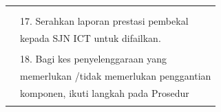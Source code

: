 \documentclass[
]{article}
\begin{document}
\begin{longtable}[]{@{}ll@{}}
\begin{minipage}[t]{0.71\columnwidth}
\end{minipage}\tabularnewline
\begin{minipage}[t]{0.23\columnwidth}\raggedright
\strut
\end{minipage} & \begin{minipage}[t]{0.71\columnwidth}\raggedright
\strut
\end{minipage}\tabularnewline
\begin{minipage}[t]{0.23\columnwidth}\raggedright
\strut
\end{minipage} & \begin{minipage}[t]{0.71\columnwidth}\raggedright
17. Serahkan laporan prestasi pembekal\strut
\end{minipage}\tabularnewline
\begin{minipage}[t]{0.23\columnwidth}\raggedright
\strut
\end{minipage} & \begin{minipage}[t]{0.71\columnwidth}\raggedright
kepada SJN ICT untuk difailkan.\strut
\end{minipage}\tabularnewline
\begin{minipage}[t]{0.23\columnwidth}\raggedright
\strut
\end{minipage} & \begin{minipage}[t]{0.71\columnwidth}\raggedright
\strut
\end{minipage}\tabularnewline
\begin{minipage}[t]{0.23\columnwidth}\raggedright
\strut
\end{minipage} & \begin{minipage}[t]{0.71\columnwidth}\raggedright
18. Bagi kes penyelenggaraan yang\strut
\end{minipage}\tabularnewline
\begin{minipage}[t]{0.23\columnwidth}\raggedright
\strut
\end{minipage} & \begin{minipage}[t]{0.71\columnwidth}\raggedright
memerlukan /tidak memerlukan penggantian\strut
\end{minipage}\tabularnewline
\begin{minipage}[t]{0.23\columnwidth}\raggedright
\strut
\end{minipage} & \begin{minipage}[t]{0.71\columnwidth}\raggedright
komponen, ikuti langkah pada Prosedur\strut
\end{minipage}\tabularnewline
\begin{minipage}[t]{0.23\columnwidth}\raggedright
\strut
\end{minipage} & \begin{minipage}[t]{0.71\columnwidth}\raggedright

\end{minipage}
\end{longtable}
\end{document}
